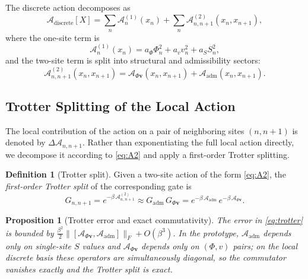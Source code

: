 \documentclass[11pt]{article}
\newtheorem{proposition}[theorem]{Proposition}
\theoremstyle{definition}
\newtheorem{definition}[theorem]{Definition}
\begin{document}
The discrete action decomposes as
\begin{equation}
  \mathcal{A}_{\mathrm{discrete}}[X]
  = \sum_n \mathcal{A}^{(1)}_n(x_n)
  + \sum_n \mathcal{A}^{(2)}_{n,n+1}(x_n, x_{n+1}),
\end{equation}
where the one-site term is
\begin{equation}
  \mathcal{A}^{(1)}_n(x_n)
  = a_\Phi\Phi_n^2 + a_v v_n^2 + a_S S_n^2,
  \label{eq:A1}
\end{equation}
and the two-site term is split into structural and admissibility sectors:
\begin{equation}
  \mathcal{A}^{(2)}_{n,n+1}(x_n,x_{n+1})
  = \mathcal{A}_{\Phi\mathbf{v}}(x_n,x_{n+1})
  + \mathcal{A}_{\mathrm{adm}}(x_n,x_{n+1}).
  \label{eq:A2}
\end{equation}

\subsection{Trotter Splitting of the Local Action}

The local contribution of the action on a pair of neighboring sites $(n,n+1)$
is denoted by $\Delta\mathcal{A}_{n,n+1}$. Rather than exponentiating the full
local action directly, we decompose it according to \eqref{eq:A2} and apply a
first-order Trotter splitting.

\begin{definition}[Trotter split]
  Given a two-site action of the form \eqref{eq:A2}, the
  \emph{first-order Trotter split} of the corresponding gate is
  \begin{equation}
    G_{n,n+1}
    = e^{-\beta\,\mathcal{A}^{(2)}_{n,n+1}}
    \approx G_{\mathrm{adm}}\,G_{\Phi\mathbf{v}}
    = e^{-\beta\,\mathcal{A}_{\mathrm{adm}}}\,
      e^{-\beta\,\mathcal{A}_{\Phi\mathbf{v}}}.
    \label{eq:trotter}
  \end{equation}
\end{definition}

\begin{proposition}[Trotter error and exact commutativity]
  \label{prop:trotter}
  The error in \eqref{eq:trotter} is bounded by
  $\frac{\beta^2}{2}\bigl\|[\mathcal{A}_{\Phi\mathbf{v}},
  \mathcal{A}_{\mathrm{adm}}]\bigr\|_F + O(\beta^3)$.
  In the prototype, $\mathcal{A}_{\mathrm{adm}}$ depends only on single-site
  $S$ values and $\mathcal{A}_{\Phi\mathbf{v}}$ depends only on $(\Phi,v)$
  pairs; on the local discrete basis these operators are simultaneously
  diagonal, so the commutator vanishes exactly and the Trotter split is exact.
\end{proposition}
\end{document}
